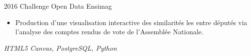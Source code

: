 \cventry
    {2016}
    {Challenge Open Data}
    {}
    {Ensimag}
    {}
    {
        \begin{itemize}
            \item Production d'une visualisation interactive des similarités les entre députés via l'analyse des comptes rendus de vote de l'Assemblée Nationale.
        \end{itemize}
        \vspace*{1mm}
        \textit{HTML5 Canvas, PostgreSQL, Python}
    }